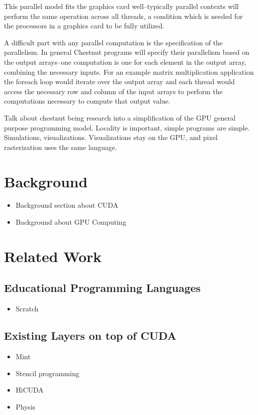 This parallel model fits the graphics card well--typically parallel contexts
will perform the same operation across all threads, a condition which is needed
for the processors in a graphics card to be fully utilized.

A difficult part with any parallel computation is the specification of the
parallelism. In general Chestnut programs will specify their parallelism based
on the output arrays--one computation is one for each element in the output
array, combining the necessary inputs. For an example matrix multiplication
application the foreach loop would iterate over the output array and each
thread would access the necessary row and column of the input arrays to perform
the computations necessary to compute that output value. 

Talk about chestnut being research into a simplification of the GPU general
purpose programming model. Locality is important, simple programs are simple.
Simulations, visualizations. Visualizations stay on the GPU, and pixel
rasterization uses the same language.


\section{Background}

\begin{itemize}
\item Background section about CUDA
\item Background about GPU Computing
\end{itemize}

\section{Related Work}

\subsection{Educational Programming Languages}

\begin{itemize}
\item Scratch
\end{itemize}

\subsection{Existing Layers on top of CUDA}
\begin{itemize}
\item Mint
\item Stencil programming
\item HiCUDA
\item Physis
\end{itemize}

